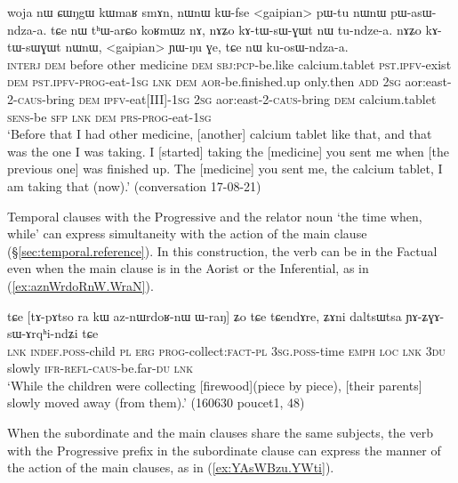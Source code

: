 \begin{exe}
\ex \label{ex:pasWndzaa.kosWndzaa}
\gll woja nɯ ɕɯŋgɯ kɯmaʁ smɤn, nɯnɯ kɯ-fse <gaipian> pɯ-tu nɯnɯ pɯ-asɯ-ndza-a. tɕe nɯ tʰɯ-arɕo koʁmɯz nɤ, nɤʑo kɤ-tɯ-sɯ-ɣɯt nɯ tu-ndze-a. nɤʑo kɤ-tɯ-sɯɣɯt nɯnɯ, <gaipian> ɲɯ-ŋu ɣe, tɕe nɯ ku-osɯ-ndza-a. \\
\textsc{interj} \textsc{dem} before other medicine \textsc{dem} \textsc{sbj}:\textsc{pcp}-be.like calcium.tablet \textsc{pst}.\textsc{ipfv}-exist \textsc{dem} \textsc{pst}.\textsc{ipfv}-\textsc{prog}-eat-\textsc{1sg} \textsc{lnk} \textsc{dem} \textsc{aor}-be.finished.up only.then \textsc{add} \textsc{2sg} aor:east-2-\textsc{caus}-bring \textsc{dem} \textsc{ipfv}-eat[III]-\textsc{1sg}  \textsc{2sg} aor:east-2-\textsc{caus}-bring \textsc{dem} calcium.tablet \textsc{sens}-be \textsc{sfp} \textsc{lnk} \textsc{dem} \textsc{prs}-\textsc{prog}-eat-\textsc{1sg} \\
\glt `Before that I had other medicine, [another] calcium tablet like that, and that was the one I was taking. I [started] taking the [medicine] you sent me when [the previous one] was finished up. The [medicine] you sent me, the calcium tablet, I am taking that (now).' (conversation 17-08-21)
\end{exe}

Temporal clauses with the Progressive and the relator noun  `the time when, while' can express simultaneity with the action of the main clause (§\ref{sec:temporal.reference}). In this construction, the verb can be in the Factual even when the main clause is in the Aorist or the Inferential, as in (\ref{ex:aznWrdoRnW.WraN}).

\begin{exe}
\ex \label{ex:aznWrdoRnW.WraN}
\gll tɕe [tɤ-pɤtso ra kɯ az-nɯrdoʁ-nɯ ɯ-raŋ] ʑo tɕe tɕendɤre, ʑɤni daltsɯtsa ɲɤ-ʑɣɤ-sɯ-ɤrqʰi-ndʑi tɕe \\
\textsc{lnk} \textsc{indef}.\textsc{poss}-child \textsc{pl} \textsc{erg} \textsc{prog}-collect:\textsc{fact}-\textsc{pl} \textsc{3sg}.\textsc{poss}-time \textsc{emph} \textsc{loc} \textsc{lnk} \textsc{3du} slowly \textsc{ifr}-\textsc{refl}-\textsc{caus}-be.far-\textsc{du} \textsc{lnk} \\
\glt `While the children were collecting [firewood](piece by piece), [their parents] slowly moved away (from them).' (160630 poucet1, 48)
\end{exe}

When the subordinate and the main clauses share the same subjects, the verb with the Progressive prefix in the subordinate clause can express the manner of the action of the main clauses, as in (\ref{ex:YAsWBzu.YWti}).

